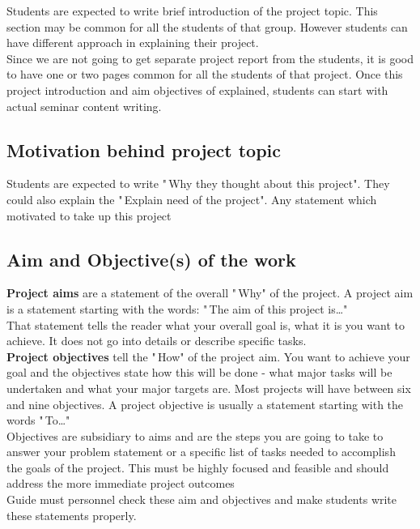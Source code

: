 \documentclass[11pt,a4paper]{article}
\begin{document}
\par Students are expected to write brief introduction of the project topic. This section may be common for all the students of that group. However students can have different approach in explaining their project.
\\

Since we are not going to get separate project report from the students, 
it is good to have one or two pages common for all the students of that 
project. Once this project introduction and aim objectives of explained, 
students can start with actual seminar content writing.

\subsection{ Motivation behind project topic}

Students are expected to write "\,Why they thought about this project". 
They could also explain the "\,Explain need of the project". Any 
statement which motivated to take up this project

\subsection{ Aim and Objective(s) of the work}

\textbf{Project aims} are a statement of the overall "\,Why" of the 
project. A project aim is a statement starting with the words: "\,The 
aim of this project is\ldots "
\\

That statement tells the reader what your overall goal is, what it is 
you want to achieve. It does not go into details or describe specific 
tasks.
\\

\textbf{Project objectives} tell the "\,How" of the project aim. You 
want to achieve your goal and the objectives state how this will be done 
- what major tasks will be undertaken and what your major targets 
are. Most projects will have between six and nine objectives. A project 
objective is usually a statement starting with the words "\,To\ldots " 
\\

Objectives are subsidiary to aims and are the steps you are going to 
take to answer your problem statement or a specific list of tasks needed 
to accomplish the goals of the project. This must be highly focused and 
feasible and should address the more immediate project outcomes
\\
Guide must personnel check these aim and objectives and make students 
write these statements properly.
\end{document}
